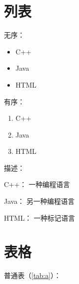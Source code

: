 \documentclass[12pt,a4paper]{article}
\begin{document}




\section{列表}

无序：

\begin{itemize}

\item  C++

\item  Java

\item  HTML

\end{itemize}



有序：

\begin{enumerate}

\item  C++

\item  Java

\item  HTML

\end{enumerate}



描述：

\begin{description}

\item{C++：}  一种编程语言

\item{Java：}  另一种编程语言

\item{HTML：}  一种标记语言

\end{description}



\section{表格}

普通表（\ref{tab:a}）：
\end{document}
